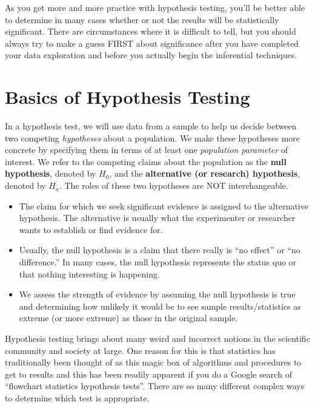 \documentclass[]{tufte-book}
\providecommand{\tightlist}{%
  \setlength{\itemsep}{0pt}\setlength{\parskip}{0pt}}
\theoremstyle{definition}
\theoremstyle{definition}
\theoremstyle{remark}
\begin{document}
As you get more and more practice with hypothesis testing, you'll be
better able to determine in many cases whether or not the results will
be statistically significant. There are circumstances where it is
difficult to tell, but you should always try to make a guess FIRST about
significance after you have completed your data exploration and before
you actually begin the inferential techniques.

\section{Basics of Hypothesis
Testing}\label{basics-of-hypothesis-testing}

In a hypothesis test, we will use data from a sample to help us decide
between two competing \emph{hypotheses} about a population. We make
these hypotheses more concrete by specifying them in terms of at least
one \emph{population parameter} of interest. We refer to the competing
claims about the population as the \textbf{null hypothesis}, denoted by
\(H_0\), and the \textbf{alternative (or research) hypothesis}, denoted
by \(H_a\). The roles of these two hypotheses are NOT interchangeable.

\begin{itemize}
\tightlist
\item
  The claim for which we seek significant evidence is assigned to the
  alternative hypothesis. The alternative is usually what the
  experimenter or researcher wants to establish or find evidence for.
\item
  Usually, the null hypothesis is a claim that there really is ``no
  effect'' or ``no difference.'' In many cases, the null hypothesis
  represents the status quo or that nothing interesting is happening.\\
\item
  We assess the strength of evidence by assuming the null hypothesis is
  true and determining how unlikely it would be to see sample
  results/statistics as extreme (or more extreme) as those in the
  original sample.
\end{itemize}

Hypothesis testing brings about many weird and incorrect notions in the
scientific community and society at large. One reason for this is that
statistics has traditionally been thought of as this magic box of
algorithms and procedures to get to results and this has been readily
apparent if you do a Google search of ``flowchart statistics hypothesis
tests''. There are so many different complex ways to determine which
test is appropriate.
\end{document}
